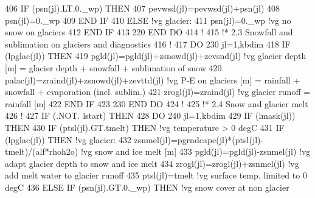 \begin{DoxyCode}
406            \textcolor{keywordflow}{IF} (psn(jl).LT.0.\_wp) \textcolor{keywordflow}{THEN}
407               pevwsd(jl)=pevwsd(jl)+psn(jl)
408               psn(jl)=0.\_wp
409 \textcolor{keywordflow}{           END IF}
410         \textcolor{keywordflow}{ELSE}                         \textcolor{comment}{!vg  glacier:}
411            psn(jl)=0.\_wp             \textcolor{comment}{!vg     no snow on glaciers}
412 \textcolor{keywordflow}{        END IF}
413 220\textcolor{keywordflow}{  END DO}
414      \textcolor{comment}{!}
415      \textcolor{comment}{!*    2.3    Snowfall and sublimation on glaciers and diagnostics}
416      \textcolor{comment}{!}
417      \textcolor{keywordflow}{DO} 230 jl=1,kbdim
418         \textcolor{keywordflow}{IF} (lpglac(jl)) \textcolor{keywordflow}{THEN}
419            pgld(jl)=pgld(jl)+zsnowd(jl)+zevsnd(jl)      \textcolor{comment}{!vg  glacier depth [m] = glacier depth + snowfall +
       sublimation of snow}
420            palac(jl)=zraind(jl)+zsnowd(jl)+zevttd(jl)   \textcolor{comment}{!vg  P-E on glaciers [m] = rainfall + snowfall +
       evaporation (incl. sublim.) }
421            zrogl(jl)=zraind(jl)                         \textcolor{comment}{!vg  glacier runoff = rainfall [m]}
422 \textcolor{keywordflow}{        END IF}
423 230\textcolor{keywordflow}{  END DO}
424      \textcolor{comment}{!}
425      \textcolor{comment}{!*    2.4    Snow and glacier melt}
426      \textcolor{comment}{!}
427      \textcolor{keywordflow}{IF} (.NOT. lstart) \textcolor{keywordflow}{THEN}
428         \textcolor{keywordflow}{DO} 240 jl=1,kbdim
429            \textcolor{keywordflow}{IF} (lmask(jl)) \textcolor{keywordflow}{THEN}
430               \textcolor{keywordflow}{IF} (ptsl(jl).GT.tmelt) \textcolor{keywordflow}{THEN}               \textcolor{comment}{!vg  temperature > 0 degC}
431                  \textcolor{keywordflow}{IF} (lpglac(jl)) \textcolor{keywordflow}{THEN}                                    \textcolor{comment}{!vg  glacier:}
432                     zsnmel(jl)=pgrndcapc(jl)*(ptsl(jl)-tmelt)/(alf*rhoh2o)  \textcolor{comment}{!vg  snow and ice melt [m]}
433                     pgld(jl)=pgld(jl)-zsnmel(jl)                            \textcolor{comment}{!vg  adapt glacier depth to
       snow and ice melt}
434                     zrogl(jl)=zrogl(jl)+zsnmel(jl)                          \textcolor{comment}{!vg  add melt water to glacier
       runoff}
435                     ptsl(jl)=tmelt                                          \textcolor{comment}{!vg  surface temp. limited to 0
       degC}
436                  \textcolor{keywordflow}{ELSE} \textcolor{keywordflow}{IF} (psn(jl).GT.0.\_wp) \textcolor{keywordflow}{THEN}                         \textcolor{comment}{!vg  snow cover at non glacier
}
\end{DoxyCode}
